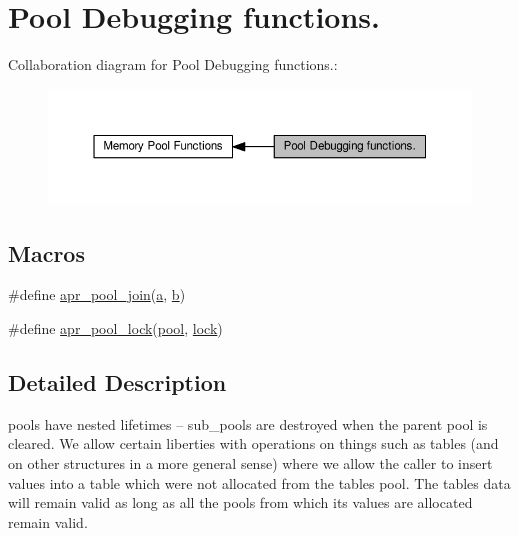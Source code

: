 \hypertarget{group__PoolDebug}{}\section{Pool Debugging functions.}
\label{group__PoolDebug}
Collaboration diagram for Pool Debugging functions.\+:
\nopagebreak
\begin{figure}[H]
\begin{center}
\leavevmode
\includegraphics[width=350pt]{group__PoolDebug}
\end{center}
\end{figure}
\subsection*{Macros}
\begin{DoxyCompactItemize}
\item 
\#define \hyperlink{group__PoolDebug_ga2f4a522b89e7bf12e17bf8427ec1a50f}{apr\+\_\+pool\+\_\+join}(\hyperlink{pcre_8txt_a841271aab70f5cda9412a19c7753f02c}{a},  \hyperlink{group__APR__Util__Bucket__Brigades_ga11dc1bdeac74315dbed17465c98879e9}{b})
\item 
\#define \hyperlink{group__PoolDebug_gaf225c04d565ebc6c37bbf018d6e407d5}{apr\+\_\+pool\+\_\+lock}(\hyperlink{group__APR__XLATE_gabb3cd978f04c73d0b763c391e9bfde73}{pool},  \hyperlink{group__APR__Util__RMM_ga0353fe7d0bd33c38d9a7a57a73b6407e}{lock})
\end{DoxyCompactItemize}


\subsection{Detailed Description}
pools have nested lifetimes -- sub\+\_\+pools are destroyed when the parent pool is cleared. We allow certain liberties with operations on things such as tables (and on other structures in a more general sense) where we allow the caller to insert values into a table which were not allocated from the table\textquotesingle{}s pool. The table\textquotesingle{}s data will remain valid as long as all the pools from which its values are allocated remain valid.

